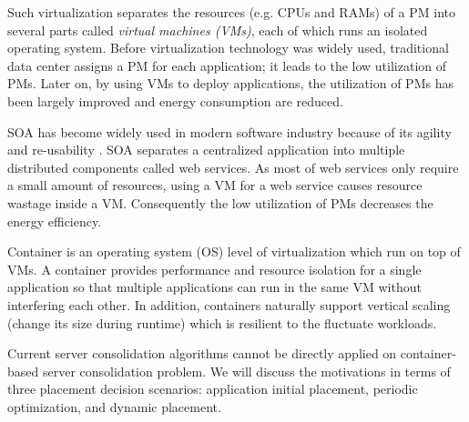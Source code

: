  Such virtualization separates the resources (e.g. CPUs and RAMs) of a PM into several parts called \emph{virtual machines (VMs)}, each of which runs an isolated operating system. Before virtualization technology was widely used, traditional data center assigns a PM for each application; it leads to the low utilization of PMs. Later on, by using VMs to deploy applications, the utilization of PMs has been largely improved and energy consumption are reduced. 

 SOA has become widely used in modern software industry because of its agility and re-usability \cite{Sprott:2004wt}. SOA separates a centralized application into multiple distributed components called web services. As most of web services only require a small amount of resources,  using a VM for a web service causes resource wastage inside a VM. Consequently the low utilization of PMs decreases the energy efficiency. 


 Container is an operating system (OS) level of virtualization which run on top of VMs. A container provides performance and resource isolation for a single application so that multiple applications can run in the same VM without interfering each other. In addition, containers naturally support vertical scaling (change its size during runtime)\cite{Vaquero:2011gb} which is resilient to the fluctuate workloads.  

 Current server consolidation algorithms cannot be directly applied on container-based server consolidation problem. We will discuss the motivations in terms of three placement decision scenarios: application initial placement, periodic optimization, and dynamic placement.


